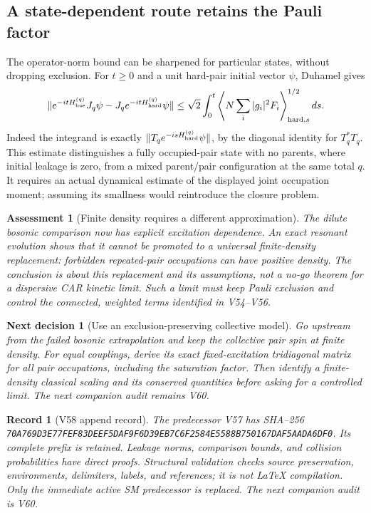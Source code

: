 \documentclass[11pt]{article}
\newtheorem{decision}[theorem]{Next decision}
\newtheorem{assessment}[theorem]{Assessment}
\newtheorem{record}[theorem]{Record}
\theoremstyle{remark}
\begin{document}
\subsection{A state-dependent route retains the Pauli factor}

The operator-norm bound can be sharpened for particular
states, without dropping exclusion.  For \(t\geq0\) and
a unit hard-pair initial vector \(\psi\), Duhamel gives
\[
 \|e^{-itH_{\rm bos}^{(q)}}J_q\psi
      -J_qe^{-itH_{\rm hard}^{(q)}}\psi\|
 \leq\sqrt2\int_0^t
 \left\langle N\sum_i|g_i|^2F_i
             \right\rangle_{{\rm hard},s}^{1/2} ds .
\]
Indeed the integrand is exactly
\(\|T_qe^{-isH_{\rm hard}^{(q)}}\psi\|\), by the
diagonal identity for \(T_q^*T_q\).
This estimate distinguishes a fully occupied-pair state
with no parents, where initial leakage is zero, from
a mixed parent/pair configuration at the same total \(q\).
It requires an actual dynamical estimate of the displayed
joint occupation moment; assuming its smallness would
reintroduce the closure problem.

\begin{assessment}[Finite density requires a different approximation]
\label{ass:v20v58}
The dilute bosonic comparison now has explicit excitation
dependence.  An exact resonant evolution shows that it
cannot be promoted to a universal finite-density replacement:
forbidden repeated-pair occupations can have positive density.
The conclusion is about this replacement and its assumptions,
not a no-go theorem for a dispersive CAR kinetic limit.
Such a limit must keep Pauli exclusion and control the
connected, weighted terms identified in V54--V56.
\end{assessment}

\begin{decision}[Use an exclusion-preserving collective model]
\label{dec:v20v58-next}
Go upstream from the failed bosonic extrapolation and keep
the collective pair spin at finite density.  For equal
couplings, derive its exact fixed-excitation tridiagonal
matrix for all pair occupations, including the saturation
factor.  Then identify a finite-density classical scaling
and its conserved quantities before asking for a controlled
limit.  The next companion audit remains V60.
\end{decision}

\begin{record}[V58 append record]
\label{rec:v20v58}
The predecessor V57 has SHA--256
\texttt{70A769D3E77FEF83DEEF5DAF9F6D39EB7C6F2584E5588B750167DAF5AADA6DF0}.
Its complete prefix is retained.  Leakage norms, comparison
bounds, and collision probabilities have direct proofs.
Structural validation checks source preservation,
environments, delimiters, labels, and references; it is
not LaTeX compilation.  Only the immediate active SM
predecessor is replaced.  The next companion audit is V60.
\end{record}
\end{document}
